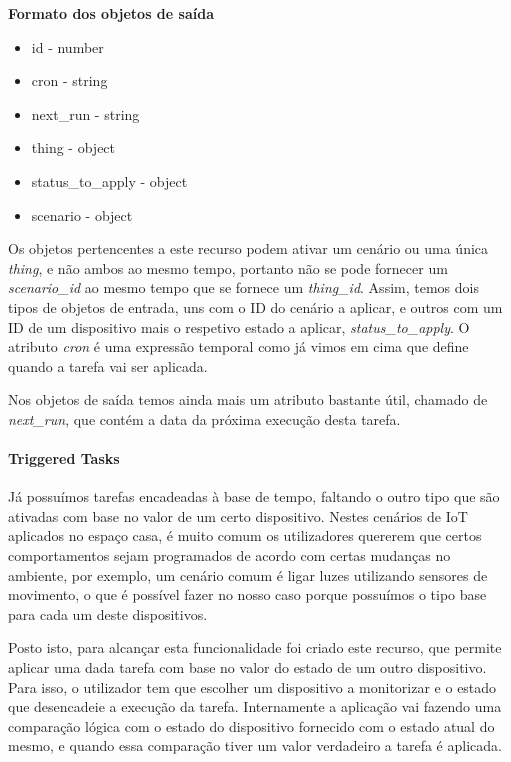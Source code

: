 \textbf{Formato dos objetos de saída}
\begin{itemize}
    \item id - number
    \item cron - string
    \item next{\_}run - string
    \item thing - object
    \item status{\_}to{\_}apply - object
    \item scenario - object
\end{itemize}

Os objetos pertencentes a este recurso podem ativar um cenário ou uma única \textit{thing}, e não ambos ao mesmo tempo, portanto não se pode fornecer um \textit{scenario{\_}id} ao mesmo tempo que se fornece um \textit{thing{\_}id}. Assim, temos dois tipos de objetos de entrada, uns com o ID do cenário a aplicar, e outros com um ID de um dispositivo mais o respetivo estado a aplicar, \textit{status{\_}to{\_}apply}. O atributo \textit{cron} é uma expressão temporal como já vimos em cima que define quando a tarefa vai ser aplicada.

Nos objetos de saída temos ainda mais um atributo bastante útil, chamado de \textit{next{\_}run}, que contém a data da próxima execução desta tarefa.

\paragraph*{Triggered Tasks}

Já possuímos tarefas encadeadas à base de tempo, faltando o outro tipo que são ativadas com base no valor de um certo dispositivo. Nestes cenários de IoT aplicados no espaço casa, é muito comum os utilizadores quererem que certos comportamentos sejam programados de acordo com certas mudanças no ambiente, por exemplo, um cenário comum é ligar luzes utilizando sensores de movimento, o que é possível fazer no nosso caso porque possuímos o tipo base para cada um deste dispositivos.

Posto isto, para alcançar esta funcionalidade foi criado este recurso, que permite aplicar uma dada tarefa com base no valor do estado de um outro dispositivo. Para isso, o utilizador tem que escolher um dispositivo a monitorizar e o estado que desencadeie a execução da tarefa. Internamente a aplicação vai fazendo uma comparação lógica com o estado do dispositivo fornecido com o estado atual do mesmo, e quando essa comparação tiver um valor verdadeiro a tarefa é aplicada.


